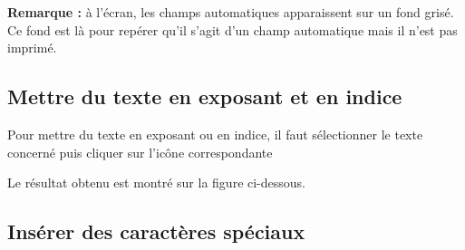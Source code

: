 
\textbf{Remarque :} à l'écran, les champs automatiques apparaissent sur un fond grisé. Ce fond est là pour repérer qu'il s'agit d'un champ automatique mais il n'est pas imprimé.



\subsection{Mettre du texte en exposant et en indice}\label{Texte3exposantIndice}

Pour mettre du texte en exposant ou en indice, il faut sélectionner le texte concerné puis cliquer sur l'icône correspondante






Le résultat obtenu est montré sur la figure ci-dessous.




\subsection{Insérer des caractères spéciaux}\label{Texte3caracteresSpeciaux}

